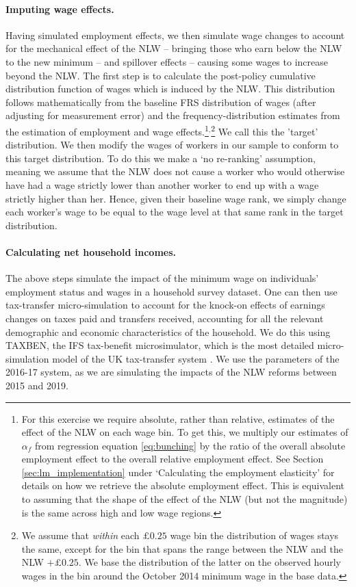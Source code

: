 \paragraph{Imputing wage effects.} Having simulated employment effects, we then simulate wage changes to account for the mechanical effect of the NLW --  bringing those who earn below the NLW to the new minimum -- and spillover effects -- causing some wages to increase beyond the NLW. The first step is to calculate the post-policy cumulative distribution function of wages which is induced by the NLW. This distribution follows mathematically from the baseline FRS distribution of wages (after adjusting for measurement error) and the frequency-distribution estimates from the estimation of employment and wage effects.\footnote{For this exercise we require absolute, rather than relative, estimates of the effect of the NLW on each wage bin. To get this, we multiply our estimates of $\alpha_f$ from regression equation \ref{eq:bunching} by the ratio of the overall absolute employment effect to the overall relative employment effect. See Section \ref{sec:lm_implementation} under `Calculating the employment elasticity' for details on how we retrieve the absolute employment effect. This is equivalent to assuming that the shape of the effect of the NLW (but not the magnitude) is the same across high and low wage regions.}$^,$\footnote{We assume that \textit{within} each $\pounds 0.25$ wage bin the distribution of wages stays the same, except for the bin that spans the range between the NLW and the NLW $+ \pounds 0.25$. We base the distribution of the latter on the observed hourly wages in the bin around the October 2014 minimum wage in the base data.} We call this the 'target' distribution. We then modify the wages of workers in our sample to conform to this target distribution. To do this we make a `no re-ranking' assumption, meaning we assume that the NLW does not cause a worker who would otherwise have had a wage strictly lower than another worker to end up with a wage strictly higher than her. Hence, given their baseline wage rank, we simply change each worker’s wage to be equal to the wage level at that same rank in the target distribution.

\paragraph{Calculating net household incomes.} The above steps simulate the impact of the minimum wage on individuals' employment status and wages in a household survey dataset. One can then use tax-transfer micro-simulation to account for the knock-on effects of earnings changes on taxes paid and transfers received, accounting for all the relevant demographic and economic characteristics of the household.  We do this using TAXBEN, the IFS tax-benefit microsimulator, which is the most detailed micro-simulation model of the UK tax-transfer system \citep{Waters2017}. We use the parameters of the 2016-17 system, as we are simulating the impacts of the NLW reforms between 2015 and 2019.


